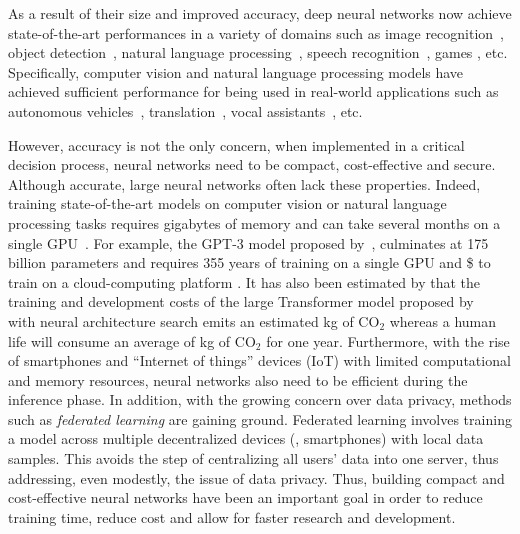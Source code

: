 As a result of their size and improved accuracy, deep neural networks now achieve state-of-the-art performances in a variety of domains such as image recognition~\cite{lecun1998gradient,krizhevsky2012imagenet,he2016deep,tan2019efficientnet}, object detection~\cite{redmon2016you,liu2016ssd,redmon2017yolo9000}, natural language processing~\cite{merity2016pointer,vaswani2017attention,radford2019language,brown2020language}, speech recognition~\cite{hinton2012deep,abdel2014convolutional,yu2016automatic}, games \cite{silver2017mastering}, etc.
Specifically, computer vision and natural language processing models have achieved sufficient performance for being used in real-world applications such as autonomous vehicles~\cite{sadat2019jointly}, translation~\cite{bahdanau2015neural}, vocal assistants~\cite{li2017acoustic}, etc.

However, accuracy is not the only concern, when implemented in a critical decision process, neural networks need to be compact, cost-effective and secure.
Although accurate, large neural networks often lack these properties.
Indeed, training state-of-the-art models on computer vision or natural language processing tasks requires gigabytes of memory and can take several months on a single GPU~\cite{krizhevsky2012imagenet,brown2020language}.
For example, the GPT-3 model proposed by~\citet{brown2020language}, culminates at 175 billion parameters and requires 355 years of training on a single GPU and \$ to train on a cloud-computing platform \cite{li2020overview}.
It has also been estimated by \citet{strubell2019energy} that the training and development costs of the large Transformer model proposed by~\citet{vaswani2017attention} with neural architecture search emits an estimated  kg of $\mathrm{CO}_2$ whereas a human life will consume an average of  kg of $\mathrm{CO}_2$ for one year. 
Furthermore, with the rise of smartphones and ``Internet of things'' devices (IoT) with limited computational and memory resources, neural networks also need to be efficient during the inference phase.
In addition, with the growing concern over data privacy, methods such as \emph{federated learning} are gaining ground.
Federated learning involves training a model across multiple decentralized devices (\eg, smartphones) with local data samples.
This avoids the step of centralizing all users' data into one server, thus addressing, even modestly, the issue of data privacy.
Thus, building compact and cost-effective neural networks have been an important goal in order to reduce training time, reduce cost and allow for faster research and development.

